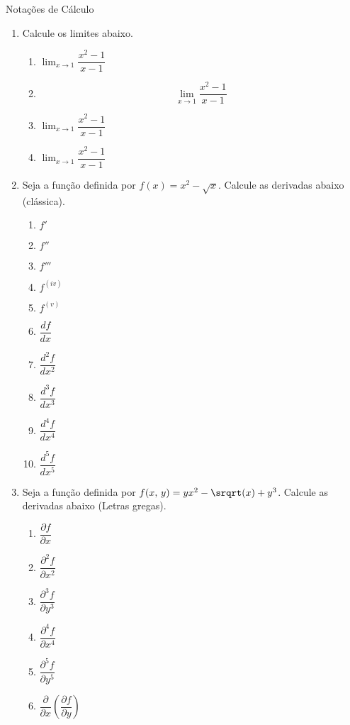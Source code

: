 \documentclass[a4paper, 12pt]{article}
\newcommand{\limite}{\displaystyle\lim}
\begin{document}
Notações de Cálculo
    \begin{enumerate}
        \item Calcule os limites abaixo.
        \begin{enumerate}
            \item $\lim_{x \to 1} \dfrac{x^2 - 1}{x - 1}$
            \item $$\lim_{x \to 1} \dfrac{x^2 - 1}{x - 1}$$
            \item $\displaystyle\lim_{x \to 1} \dfrac{x^2 - 1}{x - 1}$
            \item $\limite_{x \to 1} \dfrac{x^2 - 1}{x - 1}$
        \end{enumerate}
        
        \item Seja a função definida por $f(x) = x^2 - \sqrt{x}$. Calcule as derivadas abaixo (clássica).
        \begin{enumerate}
            \item $f'$
            \item $f''$
            \item $f'''$
            \item $f^{(iv)}$
            \item $f^{(v)}$
            \item $\dfrac{df}{dx}$
            \item $\dfrac{d^2f}{dx^2}$
            \item $\dfrac{d^3f}{dx^3}$
            \item $\dfrac{d^4f}{dx^4}$
            \item $\dfrac{d^5f}{dx^5}$
        \end{enumerate}

        \item Seja a função definida por $f(x,\,y) = yx^2 - \srqrt(x) + y^3$. Calcule as derivadas abaixo (Letras gregas).
        \begin{enumerate}
            \item $\dfrac{\partial f}{\partial x}$
            \item $\dfrac{\partial ^2f}{\partial x^2}$
            \item $\dfrac{\partial ^3f}{\partial y^3}$
            \item $\dfrac{\partial ^4f}{\partial x^4}$
            \item $\dfrac{\partial ^5f}{\partial y^5}$
            \item $\dfrac{\partial }{\partial x} \left(\dfrac{\partial f}{\partial y}\right) $
        \end{enumerate}


\end{enumerate}
\end{document}
